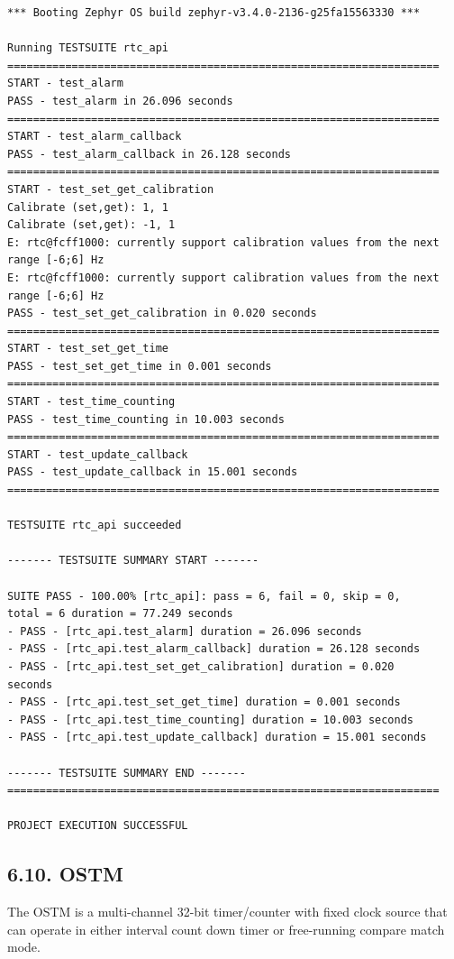 \documentclass[11pt,a4paper,oneside]{article}
\begin{document}
\begin{lstlisting}
*** Booting Zephyr OS build zephyr-v3.4.0-2136-g25fa15563330 ***

Running TESTSUITE rtc_api
===================================================================
START - test_alarm
PASS - test_alarm in 26.096 seconds
===================================================================
START - test_alarm_callback
PASS - test_alarm_callback in 26.128 seconds
===================================================================
START - test_set_get_calibration
Calibrate (set,get): 1, 1
Calibrate (set,get): -1, 1
E: rtc@fcff1000: currently support calibration values from the next
range [-6;6] Hz
E: rtc@fcff1000: currently support calibration values from the next
range [-6;6] Hz
PASS - test_set_get_calibration in 0.020 seconds
===================================================================
START - test_set_get_time
PASS - test_set_get_time in 0.001 seconds
===================================================================
START - test_time_counting
PASS - test_time_counting in 10.003 seconds
===================================================================
START - test_update_callback
PASS - test_update_callback in 15.001 seconds
===================================================================

TESTSUITE rtc_api succeeded

------- TESTSUITE SUMMARY START -------

SUITE PASS - 100.00% [rtc_api]: pass = 6, fail = 0, skip = 0,
total = 6 duration = 77.249 seconds
- PASS - [rtc_api.test_alarm] duration = 26.096 seconds
- PASS - [rtc_api.test_alarm_callback] duration = 26.128 seconds
- PASS - [rtc_api.test_set_get_calibration] duration = 0.020
seconds
- PASS - [rtc_api.test_set_get_time] duration = 0.001 seconds
- PASS - [rtc_api.test_time_counting] duration = 10.003 seconds
- PASS - [rtc_api.test_update_callback] duration = 15.001 seconds

------- TESTSUITE SUMMARY END -------
===================================================================

PROJECT EXECUTION SUCCESSFUL
\end{lstlisting}

\subsection*{6.10. OSTM}\label{ostm}

The OSTM is a multi-channel 32-bit timer/counter with fixed clock source
that can operate in either interval count down timer or free-running
compare match mode.
\end{document}
